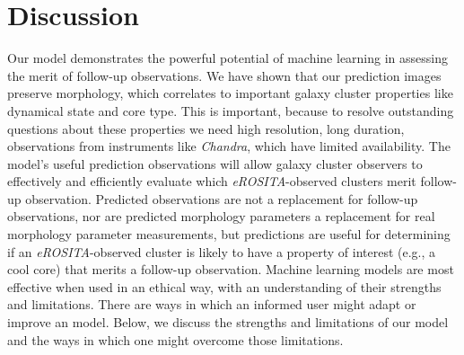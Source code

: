 \section{Discussion}\label{ch2_discussion}
Our model demonstrates the powerful potential of machine learning in assessing the merit of follow-up observations. We have shown that our prediction images preserve morphology, which correlates to important galaxy cluster properties like dynamical state and core type. This is important, because to resolve outstanding questions about these properties we need high resolution, long duration, observations from instruments like \textit{Chandra}, which have limited availability. The model's useful prediction observations will allow galaxy cluster observers to effectively and efficiently evaluate which \textit{eROSITA}-observed clusters merit follow-up observation. Predicted observations are not a replacement for follow-up observations, nor are predicted morphology parameters a replacement for real morphology parameter measurements, but predictions are useful for determining if an \textit{eROSITA}-observed cluster is likely to have a property of interest (e.g., a cool core) that merits a follow-up observation. Machine learning models are most effective when used in an ethical way, with an understanding of their strengths and limitations. There are ways in which an informed user might adapt or improve an model. Below, we discuss the strengths and limitations of our model and the ways in which one might overcome those limitations.

